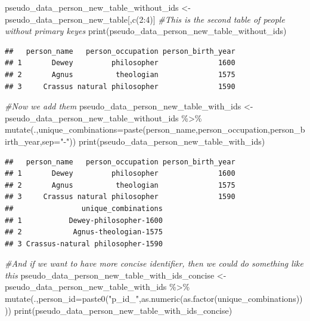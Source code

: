 \documentclass[
]{book}
\newenvironment{Shaded}{\begin{snugshade}}{\end{snugshade}}
\newcommand{\AttributeTok}[1]{\textcolor[rgb]{0.77,0.63,0.00}{#1}}
\newcommand{\CommentTok}[1]{\textcolor[rgb]{0.56,0.35,0.01}{\textit{#1}}}
\newcommand{\DecValTok}[1]{\textcolor[rgb]{0.00,0.00,0.81}{#1}}
\newcommand{\FunctionTok}[1]{\textcolor[rgb]{0.00,0.00,0.00}{#1}}
\newcommand{\NormalTok}[1]{#1}
\newcommand{\OtherTok}[1]{\textcolor[rgb]{0.56,0.35,0.01}{#1}}
\newcommand{\SpecialCharTok}[1]{\textcolor[rgb]{0.00,0.00,0.00}{#1}}
\newcommand{\StringTok}[1]{\textcolor[rgb]{0.31,0.60,0.02}{#1}}
\begin{document}
\begin{Shaded}
\begin{Highlighting}[]
\NormalTok{pseudo\_data\_person\_new\_table\_without\_ids }\OtherTok{\textless{}{-}}\NormalTok{ pseudo\_data\_person\_new\_table[,}\FunctionTok{c}\NormalTok{(}\DecValTok{2}\SpecialCharTok{:}\DecValTok{4}\NormalTok{)]}
\CommentTok{\#This is the second table of people without primary keyes}
\FunctionTok{print}\NormalTok{(pseudo\_data\_person\_new\_table\_without\_ids)}
\end{Highlighting}
\end{Shaded}

\begin{verbatim}
##   person_name   person_occupation person_birth_year
## 1       Dewey         philosopher              1600
## 2       Agnus          theologian              1575
## 3     Crassus natural philosopher              1590
\end{verbatim}

\begin{Shaded}
\begin{Highlighting}[]
\CommentTok{\#Now we add them}
\NormalTok{pseudo\_data\_person\_new\_table\_with\_ids }\OtherTok{\textless{}{-}}\NormalTok{ pseudo\_data\_person\_new\_table\_without\_ids }\SpecialCharTok{\%\textgreater{}\%} \FunctionTok{mutate}\NormalTok{(.,}\AttributeTok{unique\_combinations=}\FunctionTok{paste}\NormalTok{(person\_name,person\_occupation,person\_birth\_year,}\AttributeTok{sep=}\StringTok{"{-}"}\NormalTok{))}
\FunctionTok{print}\NormalTok{(pseudo\_data\_person\_new\_table\_with\_ids)}
\end{Highlighting}
\end{Shaded}

\begin{verbatim}
##   person_name   person_occupation person_birth_year
## 1       Dewey         philosopher              1600
## 2       Agnus          theologian              1575
## 3     Crassus natural philosopher              1590
##                unique_combinations
## 1           Dewey-philosopher-1600
## 2            Agnus-theologian-1575
## 3 Crassus-natural philosopher-1590
\end{verbatim}

\begin{Shaded}
\begin{Highlighting}[]
\CommentTok{\#And if we want to have more concise identifier, then we could do something like this}
\NormalTok{pseudo\_data\_person\_new\_table\_with\_ids\_concise }\OtherTok{\textless{}{-}}\NormalTok{ pseudo\_data\_person\_new\_table\_with\_ids }\SpecialCharTok{\%\textgreater{}\%} \FunctionTok{mutate}\NormalTok{(.,}\AttributeTok{person\_id=}\FunctionTok{paste0}\NormalTok{(}\StringTok{"p\_id\_"}\NormalTok{,}\FunctionTok{as.numeric}\NormalTok{(}\FunctionTok{as.factor}\NormalTok{(unique\_combinations))))}
\FunctionTok{print}\NormalTok{(pseudo\_data\_person\_new\_table\_with\_ids\_concise)}
\end{Highlighting}
\end{Shaded}
\end{document}
